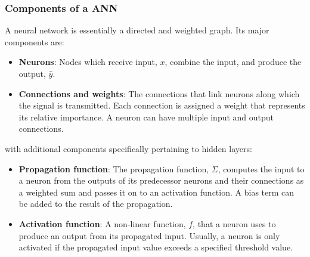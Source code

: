\documentclass[xcolor=dvipsnames, english, 8pt]{beamer}
\begin{document}
\begin{frame}
    \frametitle{Components of a ANN}
A neural network is essentially a {\color{ubRed}directed} and {\color{ubRed}weighted} graph. Its major components are:\vspace{0.25cm}\\
\begin{itemize}
    \item \textbf{\color{ubRed}Neurons}: Nodes which receive input, $x$, combine the input, and produce the output, $\hat{y}$.
    \item \textbf{\color{ubRed}Connections and weights}: The connections that link neurons along which the signal is transmitted. Each connection is assigned a weight that represents its relative importance. A neuron can have multiple input and output connections. \vspace{0.25cm}\\
    \end{itemize}
with additional components specifically pertaining to {\color{blue!50} hidden layers}:\vspace{0.25cm}\\
\begin{itemize}
    \item \textbf{\color{ubRed}Propagation function}: The propagation function, $\Sigma$, computes the input to a neuron from the outputs of its predecessor neurons and their connections as a weighted sum and passes it on to an activation function. A {\color{violet!50} bias term} can be added to the result of the propagation.
    \item \textbf{\color{ubRed}Activation function}: A non-linear function, $f$, that a neuron uses to produce an output from its propagated input. Usually, a neuron is only {\color{blue}activated} if the propagated input value exceeds a specified threshold value.
\end{itemize}

\end{frame}
\end{document}
